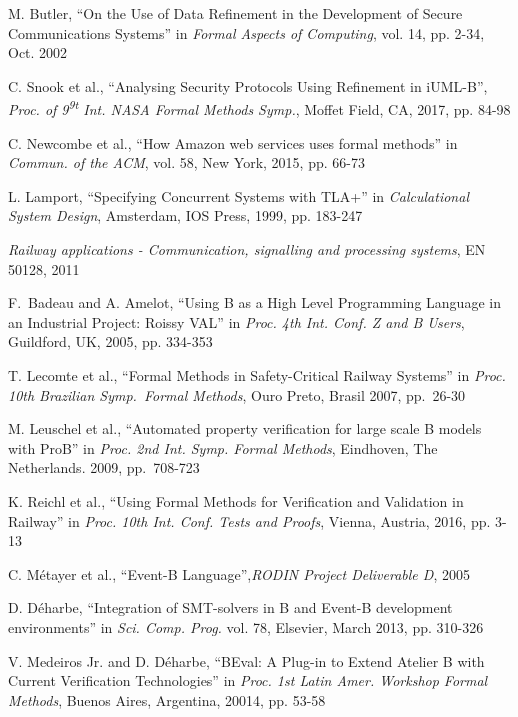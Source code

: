 \documentclass[12pt,journal,duplex]{IEEEtran}
\begin{document}
\begin{thebibliography}{2}
		M. Butler, ``On the Use of Data Refinement in the Development of Secure Communications Systems'' in \emph{Formal Aspects of Computing}, vol. 14, pp. 2-34, Oct. 2002

		C. Snook et al., ``Analysing Security Protocols Using Refinement in iUML-B'', \emph{Proc. of 9\textsuperscript{9t} Int. NASA Formal Methods Symp.}, Moffet Field, CA, 2017, pp. 84-98

		C. Newcombe et al., ``How Amazon web services uses formal methods'' in \emph{Commun. of the ACM}, vol. 58, New York, 2015, pp. 66-73

		L. Lamport, ``Specifying Concurrent Systems with TLA+'' in \emph{Calculational System Design}, Amsterdam, IOS Press, 1999, pp. 183-247

		\emph{Railway applications - Communication, signalling and processing systems}, EN 50128, 2011

		F.~Badeau and A. Amelot, ``Using B as a High Level Programming Language in an Industrial Project: Roissy VAL'' in \emph{Proc. 4th Int. Conf. Z and B Users}, Guildford, UK, 2005, pp. 334-353

		T. Lecomte et al., ``Formal Methods in Safety-Critical Railway Systems'' in \emph{Proc. 10th Brazilian Symp.~Formal Methods}, Ouro Preto, Brasil 2007, pp.~26-30

		M. Leuschel et al., ``Automated property verification for large scale B models with ProB'' in \emph{Proc. 2nd Int. Symp. Formal Methods}, Eindhoven, The Netherlands. 2009, pp.~708-723

		K. Reichl et al., ``Using Formal Methods for Verification and Validation in Railway'' in \emph{Proc. 10th Int. Conf. Tests and Proofs}, Vienna, Austria, 2016, pp. 3-13

		C. M\'{e}tayer et al., ``Event-B Language'',\emph{RODIN Project Deliverable D}, 2005

		D. D\'{e}harbe, ``Integration of SMT-solvers in B and Event-B development environments'' in \emph{Sci. Comp. Prog.} vol. 78, Elsevier, March 2013, pp. 310-326

		V. Medeiros Jr. and D. D\'{e}harbe, ``BEval: A Plug-in to Extend Atelier B with Current Verification Technologies'' in \emph{Proc. 1st Latin Amer. Workshop Formal Methods}, Buenos Aires, Argentina, 20014, pp. 53-58


\end{thebibliography}
\end{document}
